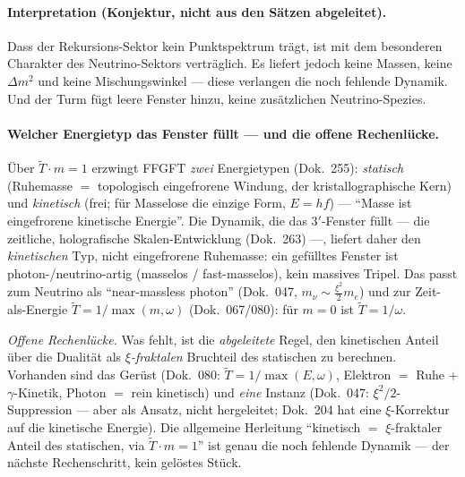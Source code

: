 \paragraph{Interpretation (Konjektur, nicht aus den S\"atzen abgeleitet).} Dass der
Rekursions-Sektor kein Punktspektrum tr\"agt, ist mit dem besonderen Charakter des
Neutrino-Sektors vertr\"aglich. Es liefert jedoch keine Massen, keine $\Delta m^2$ und keine
Mischungswinkel --- diese verlangen die noch fehlende Dynamik. Und der Turm f\"ugt leere Fenster
hinzu, keine zus\"atzlichen Neutrino-Spezies.

\paragraph{Welcher Energietyp das Fenster f\"ullt --- und die offene Rechenl\"ucke.} \"Uber
$\tilde T\cdot m=1$ erzwingt FFGFT \emph{zwei} Energietypen (Dok.~255): \emph{statisch} (Ruhemasse
$=$ topologisch eingefrorene Windung, der kristallographische Kern) und \emph{kinetisch} (frei;
f\"ur Masselose die einzige Form, $E=hf$) --- \enquote{Masse ist eingefrorene kinetische Energie}.
Die Dynamik, die das $3'$-Fenster f\"ullt --- die zeitliche, holografische Skalen-Entwicklung
(Dok.~263) ---, liefert daher den \emph{kinetischen} Typ, nicht eingefrorene Ruhemasse: ein
gef\"ulltes Fenster ist photon-/neutrino-artig (masselos / fast-masselos), kein massives Tripel. Das
passt zum Neutrino als \enquote{near-massless photon} (Dok.~047, $m_\nu\sim\tfrac{\xi^2}{2}m_e$) und
zur Zeit-als-Energie $\tilde T=1/\max(m,\omega)$ (Dok.~067/080): f\"ur $m=0$ ist $\tilde T=1/\omega$.

\emph{Offene Rechenl\"ucke.} Was fehlt, ist die \emph{abgeleitete} Regel, den kinetischen Anteil
\"uber die Dualit\"at als \emph{$\xi$-fraktalen} Bruchteil des statischen zu berechnen. Vorhanden
sind das Ger\"ust (Dok.~080: $\tilde T=1/\max(E,\omega)$, Elektron $=$ Ruhe $+$ $\gamma$-Kinetik,
Photon $=$ rein kinetisch) und \emph{eine} Instanz (Dok.~047: $\xi^2/2$-Suppression --- aber als
Ansatz, nicht hergeleitet; Dok.~204 hat eine $\xi$-Korrektur auf die kinetische Energie). Die
allgemeine Herleitung \enquote{kinetisch $=$ $\xi$-fraktaler Anteil des statischen, via
$\tilde T\cdot m=1$} ist genau die noch fehlende Dynamik --- der n\"achste Rechenschritt, kein
gel\"ostes St\"uck.

